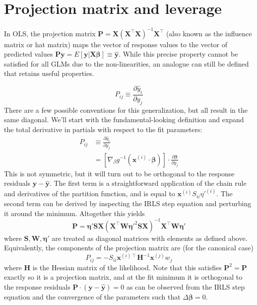 \documentclass{article}
\newcommand{\bbeta}{\boldsymbol{\beta}}
\begin{document}
\section{Projection matrix and leverage}

In OLS, the projection matrix \(\mathbf{P} =
\mathbf{X}\left(\mathbf{X}^{\intercal}\mathbf{X}\right)^{-1}\mathbf{X}^{\intercal}\)
(also known as the influence matrix or hat matrix) maps the vector of response
values to the vector of predicted values \(\mathbf{P}\mathbf{y} =
E[\mathbf{y}|\mathbf{X}\bbeta] \equiv \hat{\mathbf{y}}\). While
this precise property cannot be satisfied for all GLMs due to the
non-linearities, an analogue can still be defined that retains useful
properties.

\[ P_{ij} \equiv \frac{\partial \hat{y}_i}{\partial y_j} \]
There are a few possible conventions for this generalization, but all result in
the same diagonal. We'll start with the fundamental-looking definition and
expand the total derivative in partials with respect to the fit parameters:
\begin{align}
P_{ij} &\equiv \frac{\partial \hat{y}_i}{\partial y_j} \\
&= \left[\nabla_\beta g^{-1}\left(\mathbf{x}^{(i)}\cdot\bbeta\right)\right] \cdot \frac{\partial \bbeta}{\partial y_j}
\end{align}
This is not symmetric, but it will turn out to be orthogonal to the response
residuals \(\mathbf{y} - \hat{\mathbf{y}}\). The first term is a
straightforward application of the chain rule and derivatives of the partition
function, and is equal to
\(\mathbf{x}^{(i)}S_{ii}\eta'^{(i)}\). The
second term can be derived by inspecting the IRLS step
equation and perturbing it around the minimum. Altogether this yields
\[ \mathbf{P} = \boldsymbol{\eta}' \mathbf{S} \mathbf{X} \left(\mathbf{X}^\intercal \mathbf{W} \boldsymbol{\eta}'^{2} \mathbf{S} \mathbf{X}\right)^{-1} \mathbf{X}^\intercal \mathbf{W} \boldsymbol{\eta}' \]
where \(\mathbf{S}, \mathbf{W}, \boldsymbol{\eta}'\) are treated as diagonal
matrices with elements as defined above.
Equivalently, the components of the projection matrix are (for the canonical case)
\[ P_{ij} = -S_{ii} \mathbf{x}^{(i)\intercal}\mathbf{H}^{-1}\mathbf{x}^{(j)} w_{j} \]
where \(\mathbf{H}\) is the Hessian matrix of the likelihood.
Note that this satisfies
\(\mathbf{P}^2 = \mathbf{P}\) exactly so it is a projection matrix, and at
the fit minimum it is orthogonal to the response residuals
\(\mathbf{P}\cdot\left(\mathbf{y} - \hat{\mathbf{y}}\right) = 0\) as can be
observed from the IRLS step equation and the convergence of the parameters such
that \(\Delta \bbeta = 0\).
\end{document}
